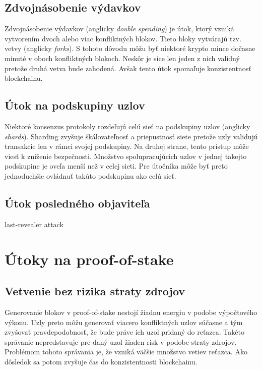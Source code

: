 \subsection{Zdvojnásobenie výdavkov}

Zdvojnásobenie výdavkov (anglicky \textit{double spending}) je útok, ktorý vzniká vytvorením dvoch alebo viac konfliktných blokov. Tieto bloky vytvárajú tzv. vetvy (anglicky \textit{forks}). S tohoto dôvodu môžu byť niektoré krypto mince dočasne minuté v oboch konfliktných blokoch. Neskôr je síce len jeden z nich validný pretože druhá vetva bude zahodená. Avšak tento útok spomaľuje konzistentnosť blockchainu.

\subsection{Útok na podskupiny uzlov}\label{subsec:shard-attack}

Niektoré konsenzus protokoly rozdeľujú celú sieť na podskupiny uzlov (anglicky \textit{shards}). Sharding zvyšuje škálovateľnosť a priepustnosť siete pretože uzly validujú transakcie len v rámci svojej podskupiny. Na druhej strane, tento prístup môže viesť k zníženie bezpečnosti. Množstvo spolupracujúcich uzlov v jednej takejto podskupine je oveľa menší než v celej sieti. Pre útočníka môže byť preto jednoduchšie ovládnuť takúto podskupinu ako celú sieť.

\subsection{Útok posledného objaviteľa}\label{subsec:lst-re-attack}

last-revealer attack~\cite{lastRevealerAttack}

\section{Útoky na proof-of-stake}

\subsection{Vetvenie bez rizika straty zdrojov}
Generovanie blokov v proof-of-stake nestojí žiadnu energiu v podobe výpočtového výkonu. Uzly preto môžu generovať viacero konfliktných uzlov súčasne a tým zvyšovať pravdepodobnosť, že bude práve ich uzol pridaný do reťazca. Takéto správanie nepredstavuje pre daný uzol žiaden risk v podobe straty zdrojov. Problémom tohoto správania je, že vzniká väčšie množstvo vetiev reťazca. Ako dôsledok sa potom zvyšuje čas do konzistentnosti blockchainu.

